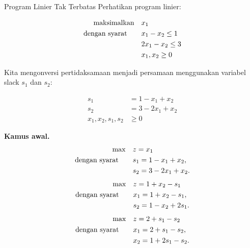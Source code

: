 \begin{example}{Program Linier Tak Terbatas}\label{exa:simplex-unbounded}{}
\label{example:simplex-unbounded}
Perhatikan program linier:

\[
\begin{aligned}
\mbox{maksimalkan} \quad & x_1 \\
\mbox{dengan syarat}\quad \quad
& x_1 - x_2 \leq 1 \\
& 2x_1 - x_2 \leq 3 \\
& x_1, x_2 \geq 0
\end{aligned}
\]

\begin{center}
\par{}\label{fig:unbounded-desmos-simplex}%

\end{center}
Kita mengonversi pertidaksamaan menjadi persamaan menggunakan variabel slack \( s_1 \) dan \( s_2 \):

\[
\begin{aligned}
s_1 &= 1 - x_1 + x_2 \\
s_2 &= 3 - 2x_1 + x_2 \\
x_1, x_2, s_1, s_2 &\geq 0
\end{aligned}
\]

\noindent\textbf{Kamus awal.}
\[
\begin{aligned}
\max\quad & z = x_1 \\
\mbox{dengan syarat}\quad\quad & s_1 = 1 - x_1 + x_2,\\
& s_2 = 3 - 2x_1 + x_2.
\end{aligned}
\]
\[
\begin{aligned}
\max\quad & z = 1 + x_2 - s_1 \\
\mbox{dengan syarat}\quad\quad & x_1 = 1 + x_2 - s_1,\\
& s_2 = 1 - x_2 + 2s_1.
\end{aligned}
\]
\[
\begin{aligned}
\max\quad & z = 2 + s_1 - s_2 \\
\mbox{dengan syarat}\quad\quad & x_1 = 2 + s_1 - s_2,\\
& x_2 = 1 + 2s_1 - s_2.
\end{aligned}
\]


\end{example}
